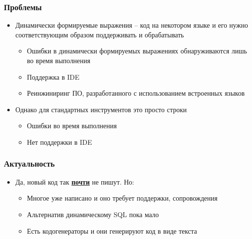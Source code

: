 \documentclass{beamer}
\begin{document}
\begin{frame}[fragile]
	\transwipe[direction=90]
	\frametitle{Проблемы}
	\begin{itemize}
	    \item Динамически формируемые выражения -- код на некотором языке и его нужно соответствующим образом поддерживать и обрабатывать
        \begin{itemize}
    	    \item Ошибки в динамически формируемых выражениях обнаруживаются лишь во время выполнения
	        \item Поддержка в IDE
	        \item Реинжиниринг ПО, разработанного с использованием встроенных языков
	    \end{itemize}
	    \item Однако для стандартных инструментов это просто строки
        \begin{itemize}
    	    \item Ошибки во время выполнения
	        \item Нет поддержки в IDE
	    \end{itemize}
    \end{itemize}
\end{frame}

\begin{frame}[fragile]
	\transwipe[direction=90]
	\frametitle{Актуальность}
	\begin{itemize}
	    \item Да, новый код так \textbf{\underline{почти}} не пишут. Но:
        \begin{itemize}
    	    \item Многое уже написано и оно требует поддержки, сопровождения
	        \item Альтернатив динамическому SQL пока мало
	        \item Есть кодогенераторы и они генерируют код в виде текста
	    \end{itemize}
    \end{itemize}
\end{frame}
\end{document}
